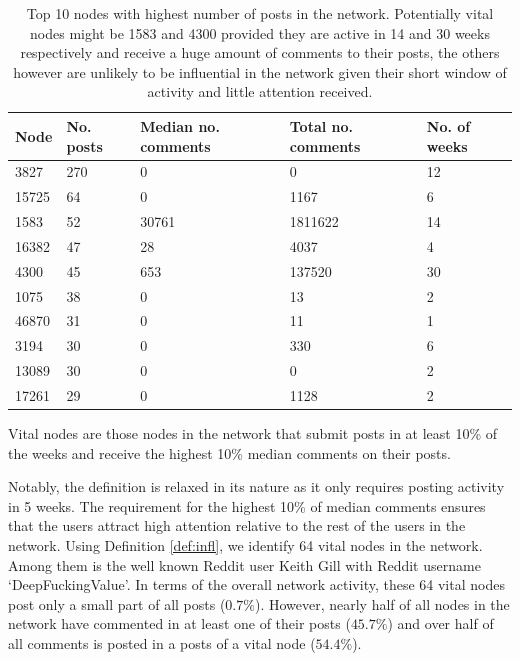 \begin{table}
	\caption{Top 10 nodes with highest number of posts in the network. Potentially vital nodes might be 1583 and 4300 provided they are active in 14 and 30 weeks respectively and receive a huge amount of comments to their posts, the others however are unlikely to be influential in the network given their short window of activity and little attention received.}
	\centering
	\begin{tabular}[t]{lllll}
		\hline \hline
		Node & No. posts & Median no. comments & Total no. comments & No. of weeks\\
		\hline
		3827 & 270 & 0 & 0 & 12\\
		15725 & 64 & 0 & 1167 & 6\\
		1583 & 52 & 30761 & 1811622 & 14\\
		16382 & 47 & 28 & 4037 & 4\\
		4300 & 45 & 653 & 137520 & 30\\
		1075 & 38 & 0 & 13 & 2\\
			46870 & 31 & 0 & 11 & 1\\
			3194 & 30 & 0 & 330 & 6\\
			13089 & 30 & 0 & 0 & 2\\
			17261 & 29 & 0 & 1128 & 2\\
		\hline \hline
	\end{tabular}
	\label{tab:threads}
\end{table}


\begin{definition} \label{def:infl}
	Vital nodes are those nodes in the network that submit posts in at least 10\% of the weeks and receive the highest 10\% median comments on their posts. 
\end{definition}

Notably, the definition is relaxed in its nature as it only requires posting activity in 5 weeks. The requirement for the highest 10\% of median comments ensures that the users attract high attention relative to the rest of the users in the network. %
Using Definition \ref{def:infl}, we identify 64 vital nodes in the network. Among them is the well known Reddit user Keith Gill with Reddit username `DeepFuckingValue'. 
In terms of the overall network activity, these 64 vital nodes post only a small part of all posts ($0.7\%$). However, nearly half of all nodes in the network have commented in at least one of their posts ($45.7\%$) and over half of all comments is posted in a posts of a vital node ($54.4\%$).%


